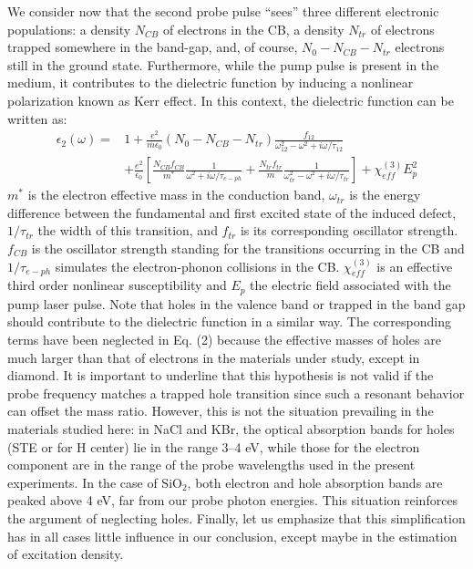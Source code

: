 \documentclass[aps,prb,reprint]{revtex4-2}
\begin{document}
We consider now that the second probe pulse ``sees'' three different electronic populations: a density $N_{CB}$ of electrons in the CB, a density $N_{tr}$ of electrons trapped somewhere in the band-gap, and, of course, $N_0 - N_{CB} - N_{tr}$ electrons still in the ground state. Furthermore, while the pump pulse is present in the medium, it contributes to the dielectric function by inducing a nonlinear polarization known as Kerr effect.\cite{14} In this context, the dielectric function can be written as:
\begin{equation}
\begin{aligned}
\epsilon_2(\omega) = & 1 + \frac{e^2}{m \epsilon_0} (N_0 - N_{CB} - N_{tr}) \frac{f_{12}}{\omega_{12}^2 - \omega^2 + i\omega/\tau_{12}} \\
& + \frac{e^2}{\epsilon_0} \left[ \frac{N_{CB} f_{CB}}{m^*} \frac{1}{\omega^2 + i\omega/\tau_{e-ph}} + \frac{N_{tr} f_{tr}}{m} \frac{1}{\omega_{tr}^2 - \omega^2 + i\omega/\tau_{tr}} \right] + \chi_{eff}^{(3)} E_p^2
\end{aligned}
\end{equation}
 $m^*$ is the electron effective mass in the conduction band, $\omega_{tr}$ is the energy difference between the fundamental and first excited state of the induced defect, $1/\tau_{tr}$ the width of this transition, and $f_{tr}$ is its corresponding oscillator strength. $f_{CB}$ is the oscillator strength standing for the transitions occurring in the CB and $1/\tau_{e-ph}$ simulates the electron-phonon collisions in the CB. $\chi_{eff}^{(3)}$ is an effective third order nonlinear susceptibility and $E_p$ the electric field associated with the pump laser pulse. Note that holes in the valence band or trapped in the band gap should contribute to the dielectric function in a similar way. The corresponding terms have been neglected in Eq. (2) because the effective masses of holes are much larger than that of electrons in the materials under study, except in diamond. It is important to underline that this hypothesis is not valid if the probe frequency matches a trapped hole transition since such a resonant behavior can offset the mass ratio. However, this is not the situation prevailing in the materials studied here: in NaCl and KBr, the optical absorption bands for holes (STE or for H center) lie in the range 3--4 eV, while those for the electron component are in the range of the probe wavelengths used in the present experiments.\cite{15} In the case of SiO$_2$, both electron and hole absorption bands are peaked above 4 eV, far from our probe photon energies.\cite{16,17} This situation reinforces the argument of neglecting holes. Finally, let us emphasize that this simplification has in all cases little influence in our conclusion, except maybe in the estimation of excitation density.
\end{document}
